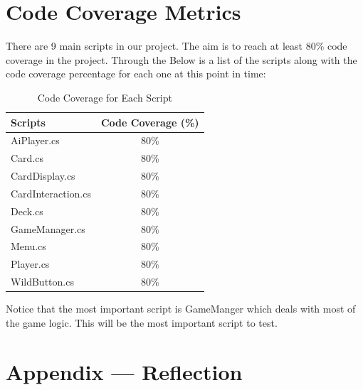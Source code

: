 \documentclass[12pt, titlepage]{article}
\begin{document}
\section{Code Coverage Metrics}
There are 9 main scripts in our project. The aim is to reach at least 80\% code coverage in the project. Through the Below is a list of the scripts along with the code coverage percentage for each one at this point in time:
\begin{table}[h]
    \centering
    \begin{tabular}{|l|c|}
        \hline
        \textbf{Scripts} & \textbf{Code Coverage (\%)} \\
        \hline
        AiPlayer.cs & 80\% \\ 
        Card.cs & 80\% \\ 
        CardDisplay.cs & 80\% \\ 
        CardInteraction.cs & 80\% \\ 
        Deck.cs & 80\% \\ 
        GameManager.cs & 80\% \\ 
        Menu.cs & 80\% \\ 
        Player.cs & 80\% \\ 
        WildButton.cs & 80\% \\ 
        \hline
    \end{tabular}
    \caption{Code Coverage for Each Script}
    \label{tab:code_coverage}
\end{table}
Notice that the most important script is GameManger which deals with most of the game logic. This will be the most important script to test.



\newpage{}
\section*{Appendix --- Reflection}
\end{document}
